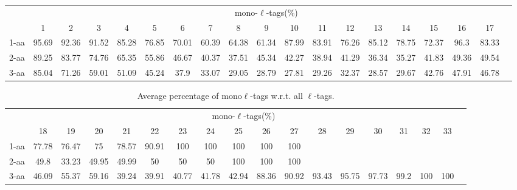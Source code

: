 \documentclass{article}
\begin{document}
\begin{table}[h]\tiny
\vspace{3mm}
{\centering
\begin{center}
\begin{tabular}{|l|c|c|c|c|c|c|c|c|c|c|c|c|c|c|c|c|c|c|}
  \hline
  & \multicolumn{ 17 }{|c|}{mono-$\ell$-tags(\%)} \\
  \cline{2- 18}
    & 1 & 2 & 3 & 4 & 5 & 6 & 7 & 8 & 9 & 10 & 11 & 12 & 13 & 14 & 15 & 16 & 17\\
  \hline
1-aa  & 95.69 & 92.36 & 91.52 & 85.28 & 76.85 & 70.01 & 60.39 & 64.38 & 61.34 & 87.99 & 83.91 & 76.26 & 85.12 & 78.75 & 72.37 & 96.3 & 83.33\\
2-aa  & 89.25 & 83.77 & 74.76 & 65.35 & 55.86 & 46.67 & 40.37 & 37.51 & 45.34 & 42.27 & 38.94 & 41.29 & 36.34 & 35.27 & 41.83 & 49.36 & 49.54\\
3-aa  & 85.04 & 71.26 & 59.01 & 51.09 & 45.24 & 37.9 & 33.07 & 29.05 & 28.79 & 27.81 & 29.26 & 32.37 & 28.57 & 29.67 & 42.76 & 47.91 & 46.78\\
 \hline
\end{tabular}
\end{center}
\par}
\centering

\vspace{3mm}
\label{table:table7}
\end{table}
\begin{table}[h]\tiny
\vspace{3mm}
{\centering
\begin{center}
\begin{tabular}{|l|c|c|c|c|c|c|c|c|c|c|c|c|c|c|c|c|c|}
  \hline
  & \multicolumn{ 16 }{|c|}{mono-$\ell$-tags(\%)} \\
  \cline{2- 17}
    & 18 & 19 & 20 & 21 & 22 & 23 & 24 & 25 & 26 & 27 & 28 & 29 & 30 & 31 & 32 & 33\\
  \hline
1-aa  & 77.78 & 76.47 & 75 & 78.57 & 90.91 & 100 & 100 & 100 & 100 & 100 &  &  &  &  &  & \\
2-aa  & 49.8 & 33.23 & 49.95 & 49.99 & 50 & 50 & 50 & 100 & 100 & 100 &  &  &  &  &  & \\
3-aa  & 46.09 & 55.37 & 59.16 & 39.24 & 39.91 & 40.77 & 41.78 & 42.94 & 88.36 & 90.92 & 93.43 & 95.75 & 97.73 & 99.2 & 100 & 100\\
 \hline
\end{tabular}
\end{center}
\par}
\centering

\caption{ Average percentage of mono$\ell$-tags w.r.t. all $\ell$-tags.}

\vspace{3mm}
\label{table:table7}
\end{table}
\end{document}
